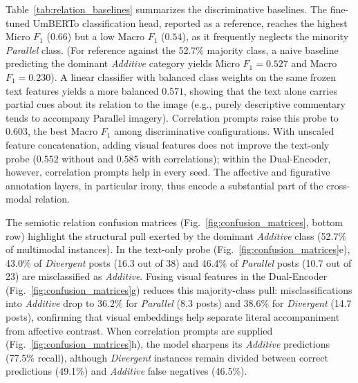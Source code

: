 Table~\ref{tab:relation_baselines} summarizes the discriminative baselines. The fine-tuned UmBERTo classification head, reported as a reference, reaches the highest Micro $F_1$ ($0.66$) but a low Macro $F_1$ ($0.54$), as it frequently neglects the minority \textit{Parallel} class. (For reference against the 52.7\% majority class, a naive baseline predicting the dominant \textit{Additive} category yields Micro $F_1 = 0.527$ and Macro $F_1 = 0.230$). A linear classifier with balanced class weights on the same frozen text features yields a more balanced $0.571$, showing that the text alone carries partial cues about its relation to the image (e.g., purely descriptive commentary tends to accompany Parallel imagery). Correlation prompts raise this probe to $0.603$, the best Macro $F_1$ among discriminative configurations. With unscaled feature concatenation, adding visual features does not improve the text-only probe ($0.552$ without and $0.585$ with correlations); within the Dual-Encoder, however, correlation prompts help in every seed. The affective and figurative annotation layers, in particular irony, thus encode a substantial part of the cross-modal relation.

The semiotic relation confusion matrices (Fig.~\ref{fig:confusion_matrices}, bottom row) highlight the structural pull exerted by the dominant \textit{Additive} class (52.7\% of multimodal instances). In the text-only probe (Fig.~\ref{fig:confusion_matrices}e), 43.0\% of \textit{Divergent} posts (16.3 out of 38) and 46.4\% of \textit{Parallel} posts (10.7 out of 23) are misclassified as \textit{Additive}. Fusing visual features in the Dual-Encoder (Fig.~\ref{fig:confusion_matrices}g) reduces this majority-class pull: misclassifications into \textit{Additive} drop to 36.2\% for \textit{Parallel} (8.3 posts) and 38.6\% for \textit{Divergent} (14.7 posts), confirming that visual embeddings help separate literal accompaniment from affective contrast. When correlation prompts are supplied (Fig.~\ref{fig:confusion_matrices}h), the model sharpens its \textit{Additive} predictions (77.5\% recall), although \textit{Divergent} instances remain divided between correct predictions (49.1\%) and \textit{Additive} false negatives (46.5\%).

